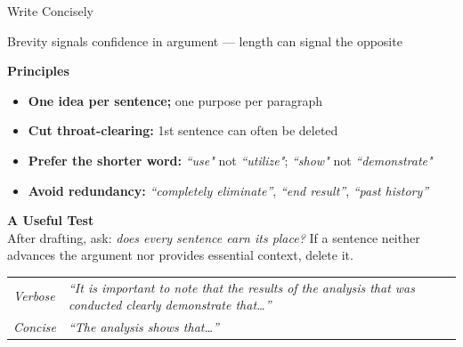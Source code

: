\documentclass{beamer}
\begin{document}
\begin{frame}{Write Concisely}

  \footnotesize
  Brevity signals confidence in argument --- length can signal the opposite

  \medskip
  \textbf{Principles}
  \begin{itemize}
    \item \textbf{One idea per sentence;} one purpose per paragraph
    \item \textbf{Cut throat-clearing:} 1st sentence can often be deleted
    \item \textbf{Prefer the shorter word:} \textit{``use"} not
      \textit{``utilize"}; \textit{``show"} not \textit{``demonstrate"}
    \item \textbf{Avoid redundancy:} \textit{``completely eliminate''},
      \textit{``end result''}, \textit{``past history''}
  \end{itemize}

  \medskip
  \textbf{A Useful Test}\\
  \smallskip
  After drafting, ask: \emph{does every sentence earn its place?}
  If a sentence neither advances the argument nor provides essential
  context, delete it.

  \medskip
  {\scriptsize
  \begin{tabular}{@{}lp{8cm}@{}}
    \hline
    \textit{Verbose}  & \textit{``It is important to note that the results
                        of the analysis that was conducted clearly
                        demonstrate that\ldots''} \\
    \textit{Concise}  & \textit{``The analysis shows that\ldots''} \\
    \hline
  \end{tabular}
  }

\end{frame}
\end{document}
